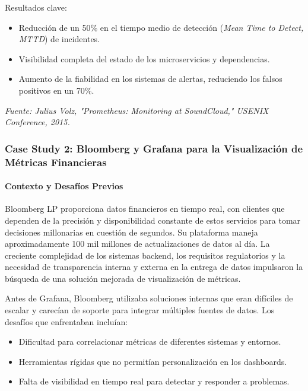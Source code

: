 {                Resultados clave:
                \begin{itemize}
                    \item Reducción de un 50\% en el tiempo medio de detección (\textit{Mean Time to Detect, MTTD}) de incidentes.
                    \item Visibilidad completa del estado de los microservicios y dependencias.
                    \item Aumento de la fiabilidad en los sistemas de alertas, reduciendo los falsos positivos en un 70\%.
                \end{itemize}
                
                \begin{flushright}
                \textit{Fuente: Julius Volz, "Prometheus: Monitoring at SoundCloud," USENIX Conference, 2015.}
                \end{flushright}
            
            \subsubsection{Case Study 2: Bloomberg y Grafana para la Visualización de Métricas Financieras}
                \paragraph{Contexto y Desafíos Previos}  
                Bloomberg LP proporciona datos financieros en tiempo real, con clientes que dependen de la precisión y disponibilidad constante de estos servicios para tomar decisiones millonarias en cuestión de segundos. Su plataforma maneja aproximadamente 100 mil millones de actualizaciones de datos al día. La creciente complejidad de los sistemas backend, los requisitos regulatorios y la necesidad de transparencia interna y externa en la entrega de datos impulsaron la búsqueda de una solución mejorada de visualización de métricas.
                
                Antes de Grafana, Bloomberg utilizaba soluciones internas que eran difíciles de escalar y carecían de soporte para integrar múltiples fuentes de datos. Los desafíos que enfrentaban incluían:
                \begin{itemize}
                    \item Dificultad para correlacionar métricas de diferentes sistemas y entornos.
                    \item Herramientas rígidas que no permitían personalización en los dashboards.
                    \item Falta de visibilidad en tiempo real para detectar y responder a problemas.
                \end{itemize}
                
}
